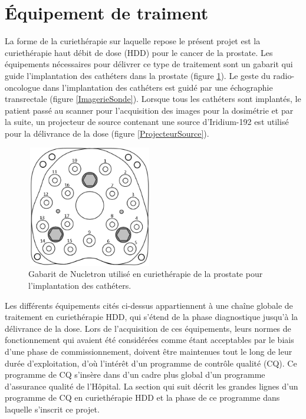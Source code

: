 \section{Équipement de traiment}
La forme de la curiethérapie sur laquelle repose le présent projet est la curiethérapie haut débit de dose (HDD) pour le cancer de la prostate. Les équipements nécessaires pour délivrer ce type de traitement sont un gabarit qui guide l’implantation des cathéters dans la prostate (figure \ref{GabaritProstate}). Le geste du radio-oncologue dans l’implantation des cathéters est guidé par une échographie transrectale (figure \ref{ImagerieSonde}). Lorsque tous les cathéters sont implantés, le patient passé au scanner pour l’acquisition des images pour la dosimétrie et par la suite, un projecteur de source contenant une source d’Iridium-192 est utilisé pour la délivrance de la dose (figure \ref{ProjecteurSource}).
%
\begin{figure}[http]
\centering
\includegraphics[width=5.5cm,height=5.3cm]{GabaritProstate.eps}
\caption{\label{GabaritProstate} Gabarit de Nucletron utilisé en curiethérapie de la prostate pour l’implantation des cathéters.}
\end{figure}
%
Les différents équipements cités ci-dessus appartiennent à une chaîne globale de traitement en curiethérapie HDD, qui s’étend de la phase diagnostique jusqu’à la délivrance de la dose. Lors de l’acquisition de ces équipements, leurs normes de fonctionnement qui avaient été considérées comme étant acceptables par le biais d’une phase de commissionnement, doivent être maintenues tout le long de leur durée d’exploitation, d’où l’intérêt d’un programme de contrôle qualité (CQ).  Ce programme de CQ s’insère dans d’un cadre plus global d’un programme d’assurance qualité de l’Hôpital. La section qui suit décrit les grandes lignes d’un programme de CQ en curiethérapie HDD et la phase de ce programme dans laquelle s’inscrit ce projet.
%
